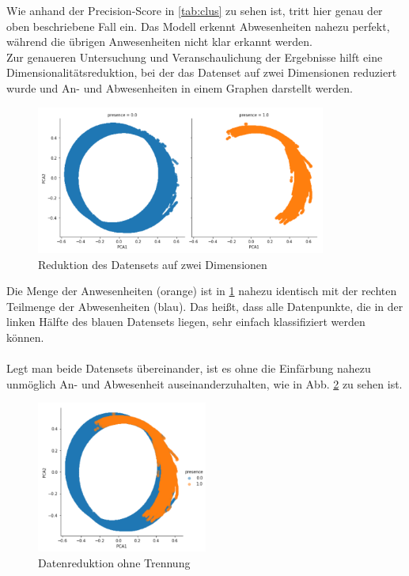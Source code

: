 Wie anhand der Precision-Score in \ref{tab:clus} zu sehen ist, tritt hier genau der oben beschriebene Fall ein.
Das Modell erkennt Abwesenheiten nahezu perfekt, während die übrigen Anwesenheiten nicht klar erkannt werden.\\
\newpage
Zur genaueren Untersuchung und Veranschaulichung der Ergebnisse hilft eine Dimensionalitätsreduktion, 
bei der das Datenset auf zwei Dimensionen reduziert wurde und An- und Abwesenheiten in einem Graphen darstellt werden.

\begin{figure}[h]
    \centering
    \includegraphics[width=0.85\textwidth]{pic/pca.png}
    \caption{Reduktion des Datensets auf zwei Dimensionen}
    \label{fig:pca}
\end{figure}

Die Menge der Anwesenheiten (orange) ist in \ref{fig:pca} nahezu identisch mit der rechten Teilmenge der 
Abwesenheiten (blau). 
Das heißt, dass alle Datenpunkte, die in der linken Hälfte des blauen Datensets liegen, sehr einfach klassifiziert 
werden können.\\\\
Legt man beide Datensets übereinander, ist es ohne die Einfärbung nahezu unmöglich An- und 
Abwesenheit auseinanderzuhalten, wie in Abb. \ref{fig:pca1} zu sehen ist.\\

\begin{figure}[h]
    \centering
    \includegraphics[width=0.5\textwidth]{pic/pca1.png}
    \caption{Datenreduktion ohne Trennung}
    \label{fig:pca1}
\end{figure}

